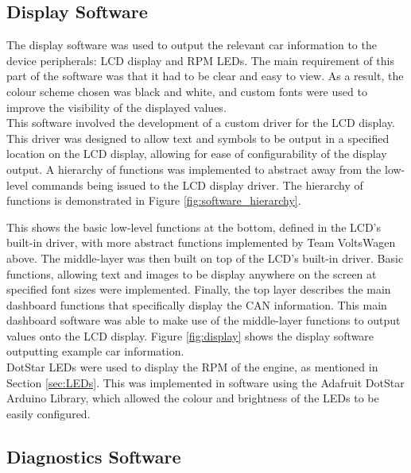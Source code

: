 \documentclass[a4paper,12pt]{article}
\begin{document}
\subsection{Display Software}
\label{sec:display_software}

The display software was used to output the relevant car information to the device peripherals: LCD display and RPM LEDs. The main requirement of this part of the software was that it had to be clear and easy to view. As a result, the colour scheme chosen was black and white, and custom fonts were used to improve the visibility of the displayed values. \\

This software involved the development of a custom driver for the LCD display. This driver was designed to allow text and symbols to be output in a specified location on the LCD display, allowing for ease of configurability of the display output. A hierarchy of functions was implemented to abstract away from the low-level commands being issued to the LCD display driver. The hierarchy of functions is demonstrated in Figure \ref{fig:software_hierarchy}. 



This shows the basic low-level functions at the bottom, defined in the LCD's built-in driver, with more abstract functions implemented by Team VoltsWagen above. The middle-layer was then built on top of the LCD's built-in driver. Basic functions, allowing text and images to be display anywhere on the screen at specified font sizes were implemented. Finally, the top layer describes the main dashboard functions that specifically display the CAN information. This main dashboard software was able to make use of the middle-layer functions to output values onto the LCD display. Figure \ref{fig:display} shows the display software outputting example car information. \\



DotStar LEDs were used to display the RPM of the engine, as mentioned in Section \ref{sec:LEDs}. This was implemented in software using the Adafruit DotStar Arduino Library, which allowed the colour and brightness of the LEDs to be easily configured.

\subsection{Diagnostics Software}
\label{sec:diagnostics_software}
\end{document}
